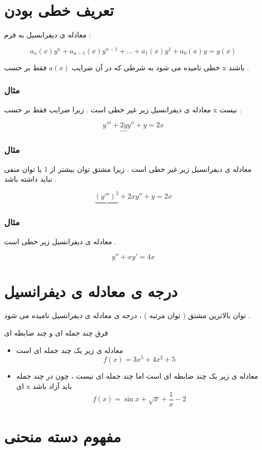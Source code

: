 \documentclass[12pt]{book}
\begin{document}
\section{تعریف خطی بودن}

معادله ی دیفرانسیل به فرم :

$$
a_{n}(x) y^{n} + a_{n-1}(x) y^{n-1} + \dots + a_{1}(x) y^{1} + a_{0}(x)y = g(x)
$$

خطی نامیده می شود به شرطی که در آن ضرایب $a(x)$ فقط بر حسب x  باشند .

\subsubsection{مثال}
معادله ی دیفرانسیل زیر غیر خطی است . زیرا ضرایب فقط بر حسب x نیست .

$$
y''' + \underbrace{2y} y'' + y = 2x 
$$


\subsubsection{مثال}
معادله ی دیفرانسیل زیر غیر خطی است . زیرا مشتق توان بیشتر از 1 یا توان منفی نباید داشته باشد .

$$
\underbrace{(y''')^{2}} + 2x y'' + y = 2x 
$$

\subsubsection{مثال}
معادله ی دیفرانسیل زیر خطی است . 

$$
y'' + x y'  = 4x
$$


\section{درجه ی معادله ی دیفرانسیل}

توان بالاترین مشتق ( توان مرتبه ) ، درجه ی معادله ی دیفرانسیل نامیده می شود .


\begin{tcolorbox}
فرق چند جمله ای و چند ضابطه ای
\begin{itemize}
	\item معادله ی زیر یک چند جمله ای است
	$$
	f(x) = 3x^{5} + 4x^{2} + 5
	$$
	\item معادله ی زیر یک چند ضابطه ای است 
	اما چند جمله ای نیست ، چون در چند جمله ای x باید آزاد باشد
	$$
	f(x) = \sin{x} + \sqrt{x} + \frac{1}{x} - 2
	$$
\end{itemize}
\end{tcolorbox}


\section{مفهوم دسته منحنی}
\end{document}
